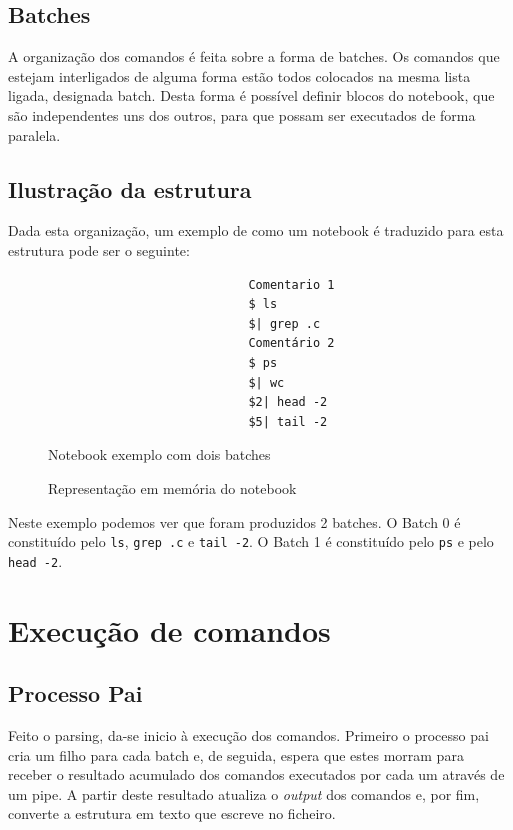 \documentclass[12pt,a4paper]{report}
\begin{document}
    \section{Batches}
        A organização dos comandos é feita sobre a forma de batches. Os comandos
        que estejam interligados de alguma forma estão todos colocados na mesma
        lista ligada, designada batch. Desta forma é possível definir blocos do
        notebook, que são independentes uns dos outros, para que possam ser
        executados de forma paralela.

    \section{Ilustração da estrutura}
        Dada esta organização, um exemplo de como um notebook é traduzido para
        esta estrutura pode ser o seguinte:

        \begin{figure}[H]
            \begin{verbatim}
                            Comentario 1
                            $ ls
                            $| grep .c
                            Comentário 2
                            $ ps
                            $| wc
                            $2| head -2
                            $5| tail -2
            \end{verbatim}
            \caption{Notebook exemplo com dois batches}
        \end{figure}
        \begin{figure}[H]
            \centering
            
            \caption{Representação em memória do notebook}
        \end{figure}

        Neste exemplo podemos ver que foram produzidos 2 batches. O Batch 0 é
        constituído pelo \texttt{ls}, \texttt{grep .c} e
        \texttt{tail -2}. O Batch 1 é constituído pelo
        \texttt{ps} e pelo \texttt{head -2}.

\chapter{Execução de comandos}

    \section{Processo Pai}
        Feito o parsing, da-se inicio à execução dos comandos. Primeiro o
        processo pai cria um filho para cada batch e, de seguida, espera que
        estes morram para receber o resultado acumulado dos comandos
        executados por cada um através de um pipe. A partir deste resultado
        atualiza o \textit{output} dos comandos e, por fim, converte a estrutura
        em texto que escreve no ficheiro.
\end{document}
